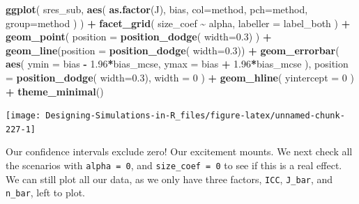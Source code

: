 \documentclass[
]{book}
\newenvironment{Shaded}{\begin{snugshade}}{\end{snugshade}}
\newcommand{\AttributeTok}[1]{\textcolor[rgb]{0.13,0.29,0.53}{#1}}
\newcommand{\DecValTok}[1]{\textcolor[rgb]{0.00,0.00,0.81}{#1}}
\newcommand{\FloatTok}[1]{\textcolor[rgb]{0.00,0.00,0.81}{#1}}
\newcommand{\FunctionTok}[1]{\textcolor[rgb]{0.13,0.29,0.53}{\textbf{#1}}}
\newcommand{\NormalTok}[1]{#1}
\newcommand{\SpecialCharTok}[1]{\textcolor[rgb]{0.81,0.36,0.00}{\textbf{#1}}}
\begin{document}
\begin{Shaded}
\begin{Highlighting}[]
\FunctionTok{ggplot}\NormalTok{( sres\_sub, }\FunctionTok{aes}\NormalTok{( }\FunctionTok{as.factor}\NormalTok{(J), bias, }
                       \AttributeTok{col=}\NormalTok{method, }\AttributeTok{pch=}\NormalTok{method, }\AttributeTok{group=}\NormalTok{method ) ) }\SpecialCharTok{+}
  \FunctionTok{facet\_grid}\NormalTok{( size\_coef }\SpecialCharTok{\textasciitilde{}}\NormalTok{ alpha, }\AttributeTok{labeller =}\NormalTok{ label\_both ) }\SpecialCharTok{+}
  \FunctionTok{geom\_point}\NormalTok{( }\AttributeTok{position =} \FunctionTok{position\_dodge}\NormalTok{( }\AttributeTok{width=}\FloatTok{0.3}\NormalTok{) ) }\SpecialCharTok{+}
  \FunctionTok{geom\_line}\NormalTok{(}\AttributeTok{position =} \FunctionTok{position\_dodge}\NormalTok{( }\AttributeTok{width=}\FloatTok{0.3}\NormalTok{)) }\SpecialCharTok{+}
  \FunctionTok{geom\_errorbar}\NormalTok{( }\FunctionTok{aes}\NormalTok{( }\AttributeTok{ymin =}\NormalTok{ bias }\SpecialCharTok{{-}} \FloatTok{1.96}\SpecialCharTok{*}\NormalTok{bias\_mcse,}
                      \AttributeTok{ymax =}\NormalTok{ bias }\SpecialCharTok{+} \FloatTok{1.96}\SpecialCharTok{*}\NormalTok{bias\_mcse ),}
                 \AttributeTok{position =} \FunctionTok{position\_dodge}\NormalTok{( }\AttributeTok{width=}\FloatTok{0.3}\NormalTok{),}
                 \AttributeTok{width =} \DecValTok{0}\NormalTok{ ) }\SpecialCharTok{+}
  \FunctionTok{geom\_hline}\NormalTok{( }\AttributeTok{yintercept =} \DecValTok{0}\NormalTok{ ) }\SpecialCharTok{+}
  \FunctionTok{theme\_minimal}\NormalTok{() }
\end{Highlighting}
\end{Shaded}

\begin{center}\texttt{[image: Designing-Simulations-in-R\_files/figure-latex/unnamed-chunk-227-1]} \end{center}

Our confidence intervals exclude zero!
Our excitement mounts.
We next check all the scenarios with \texttt{alpha\ =\ 0}, and \texttt{size\_coef\ =\ 0} to see if this is a real effect.
We can still plot all our data, as we only have three factors, \texttt{ICC}, \texttt{J\_bar}, and \texttt{n\_bar}, left to plot.
\end{document}
